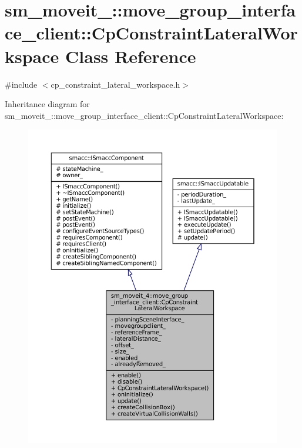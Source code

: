\hypertarget{classsm__moveit__4_1_1move__group__interface__client_1_1CpConstraintLateralWorkspace}{}\section{sm\+\_\+moveit\+\_\+:\+:move\+\_\+group\+\_\+interface\+\_\+client\+:\+:Cp\+Constraint\+Lateral\+Workspace Class Reference}
\label{classsm__moveit__4_1_1move__group__interface__client_1_1CpConstraintLateralWorkspace}


{\ttfamily \#include $<$cp\+\_\+constraint\+\_\+lateral\+\_\+workspace.\+h$>$}



Inheritance diagram for sm\+\_\+moveit\+\_\+:\+:move\+\_\+group\+\_\+interface\+\_\+client\+:\+:Cp\+Constraint\+Lateral\+Workspace\+:
\nopagebreak
\begin{figure}[H]
\begin{center}
\leavevmode
\includegraphics[width=350pt]{classsm__moveit__4_1_1move__group__interface__client_1_1CpConstraintLateralWorkspace__inherit__graph}
\end{center}
\end{figure}


